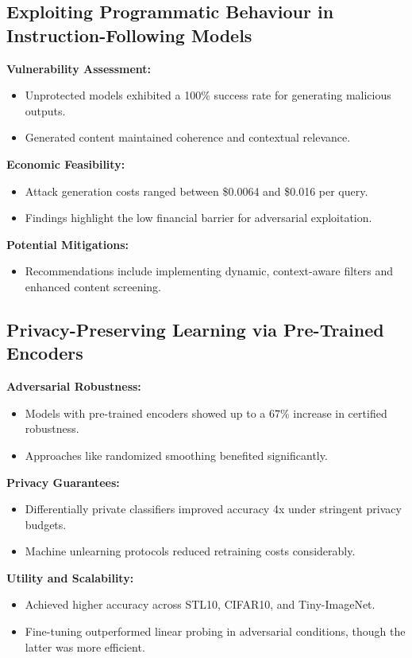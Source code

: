 \documentclass[journal]{IEEEtran}  %
\begin{document}
\subsection{Exploiting Programmatic Behaviour in Instruction-Following Models}
\textbf{Vulnerability Assessment:}
\begin{itemize}
    \item Unprotected models exhibited a 100\% success rate for generating malicious outputs.
    \item Generated content maintained coherence and contextual relevance.
\end{itemize}
\textbf{Economic Feasibility:}
\begin{itemize}
    \item Attack generation costs ranged between \$0.0064 and \$0.016 per query.
    \item Findings highlight the low financial barrier for adversarial exploitation.
\end{itemize}
\textbf{Potential Mitigations:}
\begin{itemize}
    \item Recommendations include implementing dynamic, context-aware filters and enhanced content screening.
\end{itemize}

\subsection{Privacy-Preserving Learning via Pre-Trained Encoders}
\textbf{Adversarial Robustness:}
\begin{itemize}
    \item Models with pre-trained encoders showed up to a 67\% increase in certified robustness.
    \item Approaches like randomized smoothing benefited significantly.
\end{itemize}
\textbf{Privacy Guarantees:}
\begin{itemize}
    \item Differentially private classifiers improved accuracy 4x under stringent privacy budgets.
    \item Machine unlearning protocols reduced retraining costs considerably.
\end{itemize}
\textbf{Utility and Scalability:}
\begin{itemize}
    \item Achieved higher accuracy across STL10, CIFAR10, and Tiny-ImageNet.
    \item Fine-tuning outperformed linear probing in adversarial conditions, though the latter was more efficient.
\end{itemize}
\end{document}
